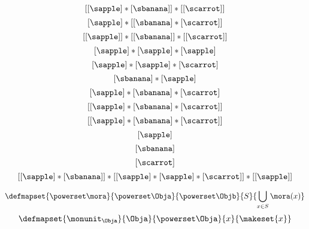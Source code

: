 {\begin{forslides}
\begin{equation}
			\label{eq:fruit-sum-7-bis}
			[ [ \sapple ]  * [ \sbanana ] ] *  [[\scarrot]]
		\end{equation}
		\begin{equation}
			\label{eq:fruit-sum-8}
			[ \sapple ]   *  [[ \sbanana ]  * [ \scarrot ]]
		\end{equation}
		\begin{equation}
			\label{eq:fruit-sum-9}
			[[ \sapple ]]  * [[ \sbanana ]] *  [[ \scarrot ]]
		\end{equation}
		\begin{equation}
			\label{eq:fruit-sum-10}
			[ \sapple ]   *  [ \sapple ]  *  [\sapple]
		\end{equation}
		\begin{equation}
			\label{eq:fruit-sum-11}
			[ \sapple ]   *  [ \sapple ]  * [ \scarrot ]
		\end{equation}
		\begin{equation}
			\label{eq:fruit-sum-12}
			[\sbanana ] * [ \sapple ]
		\end{equation}
		\begin{equation}
			\label{eq:fruit-sum-13}
			[ \sapple ]   *  [ \sbanana ]  *  [ \scarrot ]
		\end{equation}
		\begin{equation}
			\label{eq:fruit-sum-14}
			[ [ \sapple ]   *  [ \sbanana ]  *  [ \scarrot ] ]
		\end{equation}
		\begin{equation}
			\label{eq:fruit-sum-15}
			[ [ \sapple ]  *  [\sbanana]  *  [\scarrot ]  ]
		\end{equation}
		\begin{equation}
			\label{eq:fruit-sum-16}
			[ \sapple ]
		\end{equation}
		\begin{equation}
			\label{eq:fruit-sum-17}
			[ \sbanana ]
		\end{equation}
		\begin{equation}
			\label{eq:fruit-sum-18}
			[ \scarrot ]
		\end{equation}
		\begin{equation}
			\label{eq:fruit-sum-20}
			[ [ \sapple ]   * [ \sbanana] ] *  [[ \sapple ]   *  [ \sapple ] *  [\scarrot ] ]   *  [[ \sapple ] ]
		\end{equation}

		\begin{equation}
			\label{eq:monad-power-functor}
			\defmapset{
				\powerset \mora
			}{
				\powerset \Obja
			}{
				\powerset \Objb
			}{
				S
			}{
				\bigcup_{x\in S} \mora(x)
			}
		\end{equation}
		\begin{equation}
			\label{eq:monad-power-monunit}
			\defmapset{
				\monunit_\Obja
			}{
				\Obja
			}{
				\powerset\Obja
			}{
				x
			}{
				\makeset{ x }
			}
		\end{equation}


\end{forslides}}
